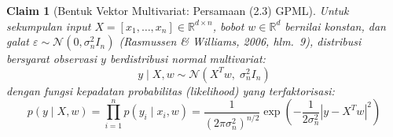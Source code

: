 \documentclass[11pt,a4paper]{article}
\def\boldsymbol#1{#1}%
\def\mathbf#1{#1}%
\newcommand{\citep}[2][]{(Rasmussen \& Williams, 2006\if\relax\detokenize{#1}\relax\else, #1\fi)}
\theoremstyle{plain}
\newtheorem{claim}{Claim}[section]
\theoremstyle{definition}
\theoremstyle{remark}
\begin{document}
\begin{claim}[Bentuk Vektor Multivariat: Persamaan (2.3) GPML]
\label{claim:likelihood_gpml}
Untuk sekumpulan input $X = [\mathbf{x}_1, \dots, \mathbf{x}_n] \in \mathbb{R}^{d \times n}$, bobot $\mathbf{w} \in \mathbb{R}^d$ bernilai konstan, dan galat $\boldsymbol{\varepsilon} \sim \mathcal{N}(\mathbf{0}, \sigma_n^2 I_n)$ \citep[hlm.~9]{rasmussen2006gaussian}, distribusi bersyarat observasi $\mathbf{y}$ berdistribusi normal multivariat:
\begin{equation}
\mathbf{y} \mid X, \mathbf{w} \sim \mathcal{N}\left( X^T \mathbf{w}, \; \sigma_n^2 I_n \right)
\end{equation}
dengan fungsi kepadatan probabilitas (likelihood) yang terfaktorisasi:
\begin{equation}
p(\mathbf{y} \mid X, \mathbf{w}) = \prod_{i=1}^n p(y_i \mid \mathbf{x}_i, \mathbf{w}) = \frac{1}{(2\pi \sigma_n^2)^{n/2}} \exp\left( -\frac{1}{2\sigma_n^2} |\mathbf{y} - X^T \mathbf{w}|^2 \right) \label{eq:gpml_eq_2_3}
\end{equation}
\end{claim}
\end{document}

